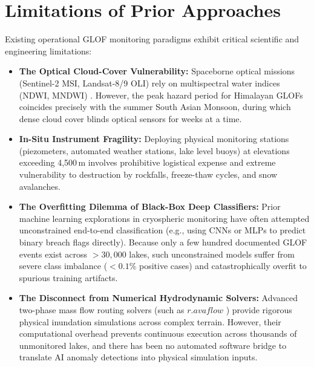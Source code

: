 \documentclass{mnnit}
\begin{document}
\section{Limitations of Prior Approaches}
Existing operational GLOF monitoring paradigms exhibit critical scientific and engineering limitations:
\begin{itemize}
    \item \textbf{The Optical Cloud-Cover Vulnerability:} Spaceborne optical missions (Sentinel-2 MSI, Landsat-8/9 OLI) rely on multispectral water indices (NDWI, MNDWI) \cite{pekel2016high, paul2015glacier}. However, the peak hazard period for Himalayan GLOFs coincides precisely with the summer South Asian Monsoon, during which dense cloud cover blinds optical sensors for weeks at a time.
    \item \textbf{In-Situ Instrument Fragility:} Deploying physical monitoring stations (piezometers, automated weather stations, lake level buoys) at elevations exceeding 4,500\,m involves prohibitive logistical expense and extreme vulnerability to destruction by rockfalls, freeze-thaw cycles, and snow avalanches.
    \item \textbf{The Overfitting Dilemma of Black-Box Deep Classifiers:} Prior machine learning explorations in cryospheric monitoring have often attempted unconstrained end-to-end classification (e.g., using CNNs or MLPs to predict binary breach flags directly). Because only a few hundred documented GLOF events exist across $> 30,000$ lakes, such unconstrained models suffer from severe class imbalance ($< 0.1\%$ positive cases) and catastrophically overfit to spurious training artifacts.
    \item \textbf{The Disconnect from Numerical Hydrodynamic Solvers:} Advanced two-phase mass flow routing solvers (such as $r.avaflow$ \cite{mergili2020ravaflow}) provide rigorous physical inundation simulations across complex terrain. However, their computational overhead prevents continuous execution across thousands of unmonitored lakes, and there has been no automated software bridge to translate AI anomaly detections into physical simulation inputs.
\end{itemize}
\end{document}
